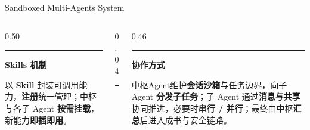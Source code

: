 \documentclass{beamer}
\newcommand{\sidehead}[2][buptred]{%
  {\color{#1}\rule[-0.15em]{2.5pt}{1.0em}}\hspace{0.45em}\textbf{\small\color{darkred}#2}\par
  \vspace{2pt}%
}
\begin{document}
\begin{frame}[t]{Sandboxed Multi-Agents System}
    \vspace{0.1cm}
    \footnotesize
    \begin{columns}[T, onlytextwidth]
        \begin{column}[T]{0.50\linewidth}
            \sidehead{Skills 机制}
            \scriptsize
            以 \textbf{Skill} 封装可调用能力，\textbf{注册}统一管理；中枢与各子 Agent \textbf{按需挂载}，新能力\textbf{即插即用}。
        \end{column}
        \begin{column}[T]{0.04\linewidth}
            \centering\textcolor{accentgold!60}{\rule{0.4pt}{4.0em}}
        \end{column}
        \begin{column}[T]{0.46\linewidth}
            \sidehead[accentgold]{协作方式}
            \scriptsize
            中枢Agent维护\textbf{会话沙箱}与任务边界，向子 Agent \textbf{分发子任务}；子 Agent 通过\textbf{消息与共享}协同推进，必要时\textbf{串行 / 并行}；最终由中枢\textbf{汇总}后进入成书与安全链路。
        \end{column}
    \end{columns}
\end{frame}
\end{document}
